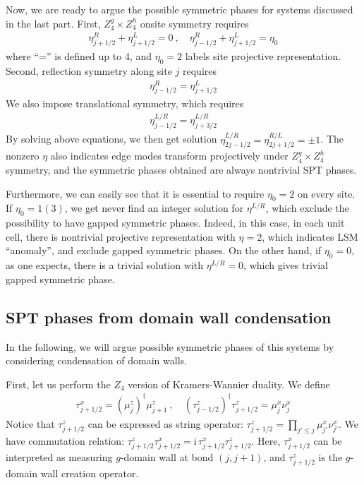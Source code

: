 \documentclass[reprint,amsmath,amssymb,aps,pra,]{revtex4-1}
\newcommand{\ii}{\mathrm{i}\,} %
\newcommand{\dg}{\dagger}
\begin{document}
Now, we are ready to argue the possible symmetric phases for systems discussed in the last part.
First, $Z_4^g\times Z_4^h$ onsite symmetry requires
\begin{align}
  \eta^R_{j+1/2}+\eta^L_{j+1/2}=0~,\quad \eta^R_{j-1/2}+\eta^L_{j+1/2}=\eta_0
  \label{}
\end{align}
where ``='' is defined up to 4, and $\eta_0=2$ labels site projective representation.
Second, reflection symmetry along site $j$ requires
\begin{align}
  \eta^R_{j-1/2}=\eta^L_{j+1/2}
  \label{}
\end{align}
We also impose translational symmetry, which requires
\begin{align}
  \eta^{L/R}_{j-1/2}=\eta^{L/R}_{j+3/2}
  \label{}
\end{align}
By solving above equations, we then get solution $\eta^{L/R}_{2j-1/2}=\eta^{R/L}_{2j+1/2}=\pm1$.
The nonzero $\eta$ also indicates edge modes transform projectively under $Z_4^g\times Z_4^h$ symmetry, and the symmetric phases obtained are always nontrivial SPT phases.

Furthermore, we can easily see that it is essential to require $\eta_0=2$ on every site.
If $\eta_0=1(3)$, we get never find an integer solution for $\eta^{L/R}$, which exclude the possibility to have gapped symmetric phases.
Indeed, in this case, in each unit cell, there is nontrivial projective representation with $\eta=2$, which indicates LSM ``anomaly'', and exclude gapped symmetric phases.
On the other hand, if $\eta_0=0$, as one expects, there is a trivial solution with $\eta^{L/R}=0$, which gives trivial gapped symmetric phase.

\subsection{SPT phases from domain wall condensation}
In the following, we will argue possible symmetric phases of this systems by considering condensation of domain walls.

First, let us perform the $Z_4$ version of Kramers-Wannier duality. We define
\begin{align}
  \tau^x_{j+1/2}=(\mu^z_j)^\dg\mu^z_{j+1}~,\quad (\tau^z_{j-1/2})^\dg\tau^z_{j+1/2}=\mu_j^x\nu_j^x
  \label{eq:z4_dw_duality}
\end{align}
Notice that $\tau^z_{j+1/2}$ can be expressed as string operator: $\tau^z_{j+1/2}=\prod_{j'\le j}\mu^x_{j'}\nu^x_{j'}$.
We have commutation relation: $\tau^z_{j+1/2}\tau^x_{j+1/2}=\ii \tau^x_{j+1/2}\tau^z_{j+1/2}$.
Here, $\tau^x_{j+1/2}$ can be interpreted as measuring $g$-domain wall at bond $(j,j+1)$, and $\tau^z_{j+1/2}$ is the $g$-domain wall creation operator.
\end{document}
